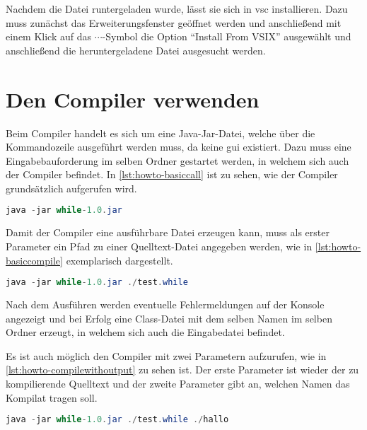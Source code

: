 Nachdem die Datei runtergeladen wurde, lässt sie sich in \ac{vsc} installieren. Dazu muss zunächst das Erweiterungsfenster geöffnet werden und anschließend mit einem Klick auf das $\cdots$-Symbol die Option \enquote{Install From VSIX} ausgewählt und anschließend die heruntergeladene Datei ausgesucht werden.


\section{Den Compiler verwenden} \label{sec:kompiler-verwenden}
Beim Compiler handelt es sich um eine Java-Jar-Datei, welche über die Kommandozeile ausgeführt werden muss, da keine \ac{gui} existiert. Dazu muss eine Eingabebauforderung im selben Ordner gestartet werden, in welchem sich auch der Compiler befindet. In \cref{lst:howto-basiccall} ist zu sehen, wie der Compiler grundsätzlich aufgerufen wird.

\begin{lstlisting}[language=java, caption=Grundlegenes Aufrufen des Compilers, label={lst:howto-basiccall}]
	java -jar while-1.0.jar
\end{lstlisting}

Damit der Compiler eine ausführbare Datei erzeugen kann, muss als erster Parameter ein Pfad zu einer Quelltext-Datei angegeben werden, wie in \cref{lst:howto-basiccompile} exemplarisch dargestellt. 

\begin{lstlisting}[language=java, caption=Kompelieren einer Datei, label={lst:howto-basiccompile}]
	java -jar while-1.0.jar ./test.while
\end{lstlisting}

Nach dem Ausführen werden eventuelle Fehlermeldungen auf der Konsole angezeigt und bei Erfolg eine Class-Datei mit dem selben Namen im selben Ordner erzeugt, in welchem sich auch die Eingabedatei befindet. 

Es ist auch möglich den Compiler mit zwei Parametern aufzurufen, wie in \cref{lst:howto-compilewithoutput} zu sehen ist. Der erste Parameter ist wieder der zu kompilierende Quelltext und der zweite Parameter gibt an, welchen Namen das Kompilat tragen soll. 

\begin{lstlisting}[language=java, caption=Kompelieren einer Datei mit vorgegebener Ausgabe, label={lst:howto-compilewithoutput}]
	java -jar while-1.0.jar ./test.while ./hallo
\end{lstlisting}

